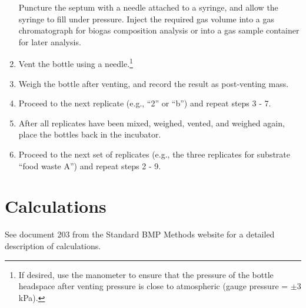 \documentclass[]{article}
\begin{document}
\begin{enumerate}
      Puncture the septum with a needle attached to a syringe, and allow the syringe to fill under pressure. 
      Inject the required gas volume into a gas chromatograph for biogas composition analysis or into a gas sample container for later analysis.
    \item Vent the bottle using a needle.\footnote{
      If desired, use the manometer to ensure that the pressure of the bottle headspace after venting pressure is close to atmospheric (gauge pressure = $\pm3$ kPa).
    }
    \item Weigh the bottle after venting, and record the result as post-venting mass. 
    \item Proceed to the next replicate (e.g., ``2'' or ``b'') and repeat steps 3 - 7.
    \item After all replicates have been mixed, weighed, vented, and weighed again, place the bottles back in the incubator.
    \item Proceed to the next set of replicates (e.g., the three replicates for substrate ``food waste A'') and repeat steps 2 - 9.
\end{enumerate}

\section{Calculations}
See document 203 from the Standard BMP Methods website \citep{BMPdoc203grav} for a detailed description of calculations. 



\end{document}

